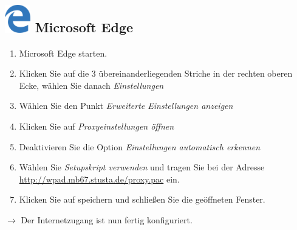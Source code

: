 \documentclass[a4paper,12pt]{scrartcl}
\begin{document}
\subsection*{\includegraphics[height=1.2cm,keepaspectratio]{Bilder/Mcrosoft_Edge_logo} Microsoft Edge}
\begin{enumerate}
    \item Microsoft Edge starten.
    \item Klicken Sie auf die 3 übereinanderliegenden Striche in der rechten oberen Ecke, wählen Sie danach \emph{Einstellungen}
    \item Wählen Sie den Punkt \emph{Erweiterte Einstellungen anzeigen}
	\item Klicken Sie auf \emph{Proxyeinstellungen öffnen}
	\item Deaktivieren Sie die Option \emph{Einstellungen automatisch erkennen}
	\item Wählen Sie \emph{Setupskript verwenden} und tragen Sie bei der Adresse \\ \url{http://wpad.mb67.stusta.de/proxy.pac} ein.
	\item Klicken Sie auf speichern und schließen Sie die geöffneten 
			Fenster.
\end{enumerate}
$\rightarrow$ Der Internetzugang ist nun fertig konfiguriert.

%
\end{document}
